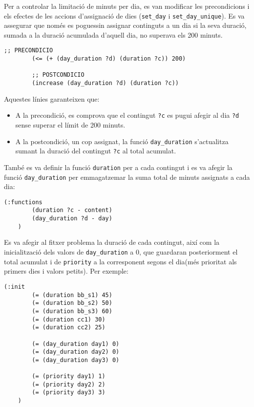 \documentclass[a4paper]{article}
\begin{document}
	Per a controlar la limitació de minuts per dia, es van modificar les precondicions i els efectes de les accions d'assignació de dies (\texttt{set\_day} i \texttt{set\_day\_unique}). Es va assegurar que només es poguessin assignar continguts a un dia si la seva duració, sumada a la duració acumulada d'aquell dia, no superava els 200 minuts.
	
	\begin{lstlisting}[language=PDDL, caption={Restriccions per controlar el límit de 200 minuts per dia}, label={lst:extensio4}]
		;; PRECONDICIO
		(<= (+ (day_duration ?d) (duration ?c)) 200)
		
		;; POSTCONDICIO
		(increase (day_duration ?d) (duration ?c))
	\end{lstlisting}
	
	Aquestes línies garanteixen que:
	\begin{itemize}
		\item A la precondició, es comprova que el contingut \texttt{?c} es pugui afegir al dia \texttt{?d} sense superar el límit de 200 minuts.
		\item A la postcondició, un cop assignat, la funció \texttt{day\_duration} s'actualitza sumant la duració del contingut \texttt{?c} al total acumulat.
	\end{itemize}
	
	També es va definir la funció \texttt{duration} per a cada contingut i es va afegir la funció \texttt{day\_duration} per emmagatzemar la suma total de minuts assignats a cada dia:
	\begin{lstlisting}[language=PDDL, caption={Funcions per l'extensió 4}, label={lst:funcionsExtensio4}]
	(:functions
		(duration ?c - content)
		(day_duration ?d - day)
	)
	\end{lstlisting}
	
	Es va afegir al fitxer problema la duració de cada contingut, així com la inicialització dels valors de \texttt{day\_duration} a 0, que guardaran posteriorment el total acumulat i de \texttt{priority} a la corresponent segons el dia(més prioritat als primers dies i valors petits). Per exemple:
	\begin{lstlisting}[language=PDDL, caption={Novetats en la inicialització per l'extensió 4}, label={lst:iniExtensio4}]
	(:init
		(= (duration bb_s1) 45)
		(= (duration bb_s2) 50)
		(= (duration bb_s3) 60)
		(= (duration cc1) 30)
		(= (duration cc2) 25)
		
		(= (day_duration day1) 0)
		(= (day_duration day2) 0)
		(= (day_duration day3) 0)

		(= (priority day1) 1)
		(= (priority day2) 2)
		(= (priority day3) 3)
	)
	\end{lstlisting}
	
\end{document}
